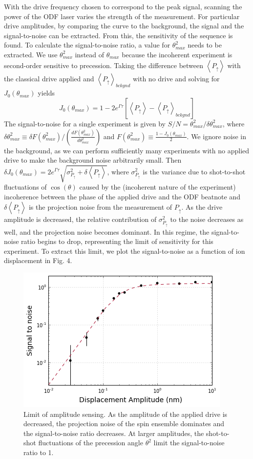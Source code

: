\documentclass[aps,prl,twocolumn,superscriptaddress,floatfix]{revtex4-1}
\begin{document}
With the drive frequency chosen to correspond to the peak signal, scanning the power of the ODF laser varies the strength of the measurement. For particular drive amplitudes, by comparing the curve to the background, the signal and the signal-to-noise can be extracted. From this, the sensitivity of the sequence is found. To calculate the signal-to-noise ratio, a value for $\theta^{2}_{max}$ needs to be extracted. We use $\theta^{2}_{max}$ instead of $\theta_{max}$ because the incoherent experiment is second-order sensitive to precession. Taking the difference between $\left< P_{\uparrow} \right>$ with the classical drive applied and $\left< P_{\uparrow} \right>_{bckgnd}$ with no drive and solving for $J_0(\theta_{max})$ yields
\[J_0(\theta_{max}) = 1 - 2e^{\Gamma \tau} \left[ \left< P_{\uparrow} \right> - \left< P_{\uparrow} \right>_{bckgnd} \right] \]
The signal-to-noise for a single experiment is given by $S/N =\theta_{max}^{2}/\delta \theta_{max}^{2}$, where $\delta \theta_{max}^{2} \equiv \delta F(\theta_{max}^{2})/ \left( \frac{dF(\theta_{max}^{2})}{d\theta_{max}^{2}} \right)$ and  $F(\theta_{max}^{2}) \equiv \frac{1-J_0(\theta_{max})}{2}$. We ignore noise in the background, as we can perform sufficiently many experiments with no applied drive to make the background noise arbitrarily small. Then $\delta J_0(\theta_{max}) = 2e^{\Gamma \tau} \sqrt{\sigma^{2}_{P_{\uparrow}} + \delta \left< P_{\uparrow} \right>}$, where $\sigma^{2}_{P_{\uparrow}}$ is the variance due to shot-to-shot fluctuations of $\cos(\theta)$ caused by the (incoherent nature of the experiment) incoherence between the phase of the applied drive and the ODF beatnote and $\delta \left< P_{\uparrow} \right>$ is the projection noise from the measurement of $P_{\uparrow}$. As the drive amplitude is decreased, the relative contribution of $\sigma^{2}_{P_{\uparrow}}$ to the noise decreases as well, and the projection noise becomes dominant. In this regime, the signal-to-noise ratio begins to drop, representing the limit of sensitivity for this experiment. To extract this limit, we plot the signal-to-noise as a function of ion displacement in Fig. 4. 
\begin{figure}[h]
\includegraphics[width=.45\textwidth]{sense_lim}
\caption{Limit of amplitude sensing. As the amplitude of the applied drive is decreased, the projection noise of the spin ensemble dominates and the signal-to-noise ratio decreases. At larger amplitudes, the shot-to-shot fluctuations of the precession angle $\theta^{2}$ limit the signal-to-noise ratio to 1. }\label{Fig 4}
\end{figure}
\end{document}
